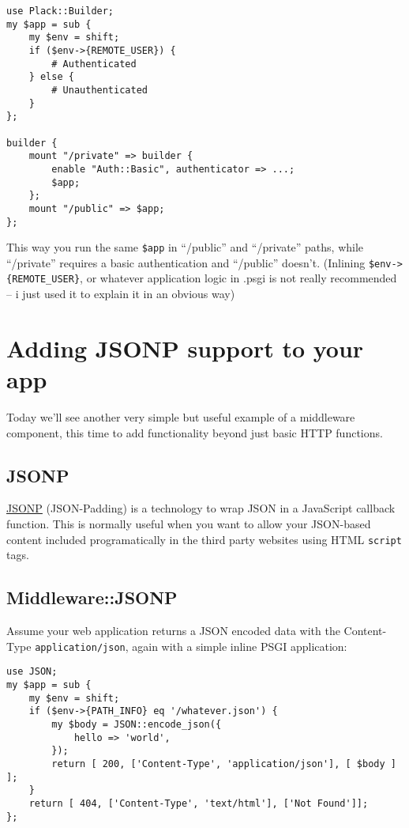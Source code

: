 \begin{lstlisting}
use Plack::Builder;
my $app = sub {
    my $env = shift;
    if ($env->{REMOTE_USER}) { 
        # Authenticated
    } else {
        # Unauthenticated
    }
};

builder {
    mount "/private" => builder {
        enable "Auth::Basic", authenticator => ...;
        $app;
    };
    mount "/public" => $app;
};
\end{lstlisting}

This way you run the same \lstinline!$app! in ``/public'' and
``/private'' paths, while ``/private'' requires a basic authentication
and ``/public'' doesn't. (Inlining \lstinline!$env->{REMOTE_USER}!, or
whatever application logic in .psgi is not really recommended -- i just
used it to explain it in an obvious way)

\chapter{Adding JSONP support to your
app}\label{day-16-adding-jsonp-support-to-your-app}

Today we'll see another very simple but useful example of a middleware
component, this time to add functionality beyond just basic HTTP
functions.

\section{JSONP}\label{jsonp}

\href{http://ajaxian.com/archives/jsonp-json-with-padding}{JSONP}
(JSON-Padding) is a technology to wrap JSON in a JavaScript callback
function. This is normally useful when you want to allow your JSON-based
content included programatically in the third party websites using HTML
\lstinline!script! tags.

\section{Middleware::JSONP}\label{middlewarejsonp}

Assume your web application returns a JSON encoded data with the
Content-Type \lstinline!application/json!, again with a simple inline
PSGI application:

\begin{lstlisting}
use JSON;
my $app = sub {
    my $env = shift;
    if ($env->{PATH_INFO} eq '/whatever.json') {
        my $body = JSON::encode_json({
            hello => 'world',
        });
        return [ 200, ['Content-Type', 'application/json'], [ $body ] ];
    }
    return [ 404, ['Content-Type', 'text/html'], ['Not Found']];
};
\end{lstlisting}

